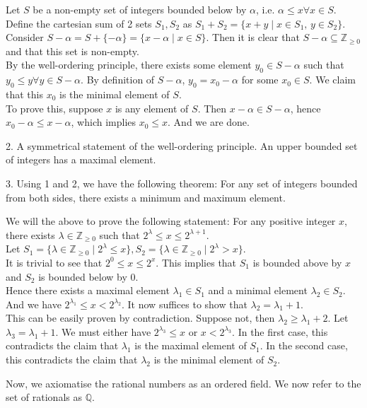 \documentclass{article}
\begin{document}
Let $S$ be a non-empty set of integers bounded below by $\alpha$, i.e. $\alpha\leq x\forall x\in S$.
Define the cartesian sum of 2 sets $S_1,S_2$ as $S_1+S_2=\{x+y\mid x\in S_1,\, y\in S_2\}$.\\
Consider $S-\alpha=S+\{-\alpha \}=\{x-\alpha  \mid x\in S\}$. Then it is clear that $S-\alpha \subseteq \mathbb{Z}_{\geq 0}$ and that this set is non-empty.\\
By the well-ordering principle, there exists some element $y_0\in S-\alpha$ such that $y_0\leq y\forall y\in S-\alpha$. By definition of $S-\alpha$, $y_0=x_0-\alpha$ for some $x_0\in S$. We claim that this $x_0$ is the minimal element of $S$.\\
To prove this, suppose $x$ is any element of $S$. Then $x-\alpha \in S-\alpha$, hence $x_0-\alpha \leq x-\alpha$, which implies $x_0\leq x$. And we are done.

2. A symmetrical statement of the well-ordering principle. An upper bounded set of integers has a maximal element.

3. Using 1 and 2, we have the following theorem: For any set of integers bounded from both sides, there exists a minimum and maximum element.

We will the above to prove the following statement: For any positive integer $x$, there exists $\lambda \in \mathbb{Z}_{\geq 0}$ such that $2^\lambda \leq x\leq 2^{\lambda+1}$.\\
Let $S_1=\{\lambda \in \mathbb{Z}_{\geq 0} \mid 2^\lambda \leq x\},S_2=\{\lambda \in \mathbb{Z}_{\geq 0} \mid 2^\lambda > x\}$.\\
It is trivial to see that $2^0\leq x \leq 2^x$. This implies that $S_1$ is bounded above by $x$ and $S_2$ is bounded below by 0.\\
Hence there exists a maximal element $\lambda_1\in S_1$ and a minimal element $\lambda_2\in S_2$. And we have $2^{\lambda_1}\leq x < 2^{\lambda_2}$. It now suffices to show that $\lambda_2=\lambda_1+1$.\\
This can be easily proven by contradiction. Suppose not, then $\lambda_2\geq \lambda_1+2$. Let $\lambda_3=\lambda_1+1$. We must either have $2^{\lambda_3}\leq x$ or $x<2^{\lambda_3}$. In the first case, this contradicts the claim that $\lambda_1$ is the maximal element of $S_1$. In the second case, this contradicts the claim that $\lambda_2$ is the minimal element of $S_2$.

Now, we axiomatise the rational numbers as an ordered field. We now refer to the set of rationals as $\mathbb{Q}$.
\end{document}
